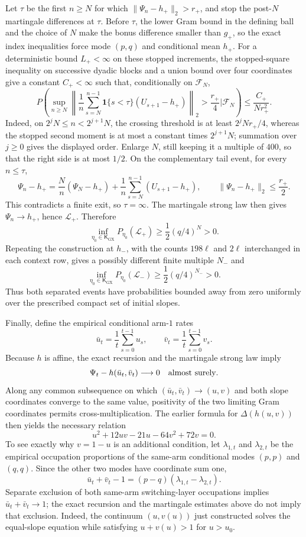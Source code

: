 Let \(\tau\) be the first \(n\ge N\) for which \(\|\Psi_n-h_+\|_2>r_+\), and stop the post-\(N\) martingale differences at \(\tau\).  Before \(\tau\), the lower Gram bound in the defining ball and the choice of \(N\) make the bonus difference smaller than \(g_+\), so the exact index inequalities force mode \((p,q)\) and conditional mean \(h_+\).  For a deterministic bound \(L_+<\infty\) on these stopped increments, the stopped-square inequality on successive dyadic blocks and a union bound over four coordinates give a constant \(C_+<\infty\) such that, conditionally on \(\mathcal F_N\),
\[
 P\!\left(
 \sup_{n\ge N}\left\|
 \frac1n\sum_{s=N}^{n-1}
 \mathbf1\{s<\tau\}(U_{s+1}-h_+)
 \right\|_2>\frac{r_+}{4}
 \mathrel{\Big|}\mathcal F_N\right)
 \le\frac{C_+}{Nr_+^2}.
\]
Indeed, on \(2^jN\le n<2^{j+1}N\), the crossing threshold is at least \(2^jNr_+/4\), whereas the stopped second moment is at most a constant times \(2^{j+1}N\); summation over \(j\ge0\) gives the displayed order.  Enlarge \(N\), still keeping it a multiple of \(400\), so that the right side is at most \(1/2\).  On the complementary tail event, for every \(n\le\tau\),
\[
 \Psi_n-h_+
 =\frac{N}{n}(\Psi_N-h_+)
 +\frac1n\sum_{s=N}^{n-1}(U_{s+1}-h_+),
 \qquad
 \|\Psi_n-h_+\|_2\le\frac{r_+}{2}.
\]
This contradicts a finite exit, so \(\tau=\infty\).  The martingale strong law then gives \(\Psi_n\to h_+\), hence \(\mathcal L_+\).  Therefore
\[
 \inf_{\eta_0\in\mathsf K_{\mathrm{GX}}}
 P_{\eta_0}(\mathcal L_+)
 \ge\frac12(q/4)^N>0.
\]
Repeating the construction at \(h_-\), with the counts \(198\ell\) and \(2\ell\) interchanged in each context row, gives a possibly different finite multiple \(N_-\) and
\[
 \inf_{\eta_0\in\mathsf K_{\mathrm{GX}}}
 P_{\eta_0}(\mathcal L_-)
 \ge\frac12(q/4)^{N_-}>0.
\]
Thus both separated events have probabilities bounded away from zero uniformly over the prescribed compact set of initial slopes.

Finally, define the empirical conditional arm-\(1\) rates
\[
 \bar u_t=\frac1t\sum_{s=0}^{t-1}u_s,
 \qquad
 \bar v_t=\frac1t\sum_{s=0}^{t-1}v_s.
\]
Because \(h\) is affine, the exact recursion and the martingale strong law imply
\[
 \Psi_t-h(\bar u_t,\bar v_t)\longrightarrow0
 \quad\hbox{almost surely}.
\]
Along any common subsequence on which \((\bar u_t,\bar v_t)\to(u,v)\) and both slope coordinates converge to the same value, positivity of the two limiting Gram coordinates permits cross-multiplication.  The earlier formula for \(\Delta(h(u,v))\) then yields the necessary relation
\[
 u^2+12uv-21u-64v^2+72v=0.
\]
To see exactly why \(v=1-u\) is an additional condition, let \(\lambda_{1,t}\) and \(\lambda_{2,t}\) be the empirical occupation proportions of the same-arm conditional modes \((p,p)\) and \((q,q)\).  Since the other two modes have coordinate sum one,
\[
 \bar u_t+\bar v_t-1=(p-q)(\lambda_{1,t}-\lambda_{2,t}).
\]
Separate exclusion of both same-arm switching-layer occupations implies \(\bar u_t+\bar v_t\to1\); the exact recursion and the martingale estimates above do not imply that exclusion.  Indeed, the continuum \((u,v(u))\) just constructed solves the equal-slope equation while satisfying \(u+v(u)>1\) for \(u>u_0\).

